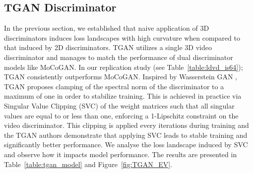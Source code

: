 \documentclass[a4paper,fleqn]{cas-sc}
\begin{document}
\subsection{TGAN Discriminator}
In the previous section, we established that naive application of 3D discriminators induces loss landscapes with high curvature when compared to that induced by 2D discriminators. TGAN \cite{SaitoMS17temporal} utilizes a single 3D video discriminator and manages to match the performance of dual discriminator models like MoCoGAN. In our replication study (see Table~\ref{table:ldvd_is64}); TGAN consistently outperforms MoCoGAN. Inspired by Wasserstein GAN \cite{ArjovskyCB17wasserstein}, TGAN proposes clamping of the spectral norm of the discriminator to a maximum of one in order to stabilize training. This is achieved in practice via Singular Value Clipping (SVC) of the weight matrices such that all singular values are equal to or less than one, enforcing a 1-Lipschitz constraint on the video discriminator. This clipping is applied every  iterations during training and the TGAN authors demonstrate that applying SVC leads to stable training and significantly better performance. We analyse the loss landscape induced by SVC and observe how it impacts model performance. The results are presented in Table~\ref{table:tgan_model} and Figure~\ref{fig:TGAN_EV}.
\end{document}
